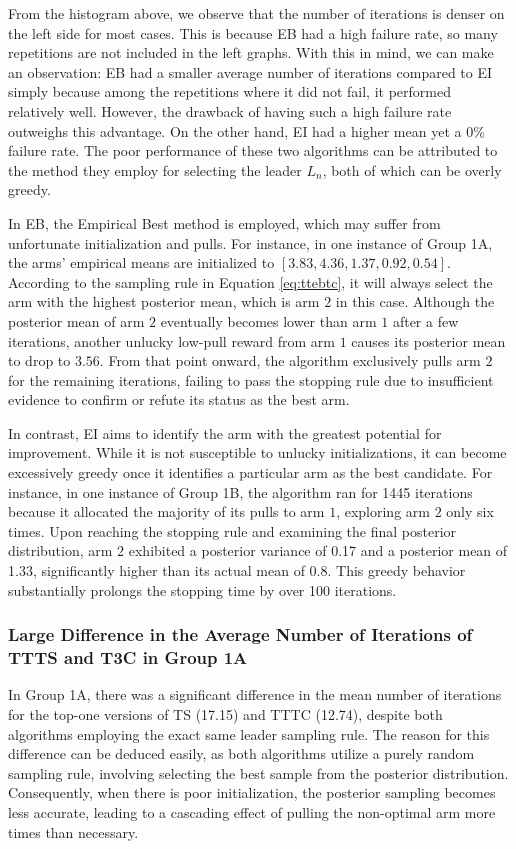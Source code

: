 \documentclass[a4paper, 12pt]{article}
\theoremstyle{definition}
\begin{document}
From the histogram above, we observe that the number of iterations is denser on the left side for most cases. This is because EB had a high failure rate, so many repetitions are not included in the left graphs. With this in mind, we can make an observation: EB had a smaller average number of iterations compared to EI simply because among the repetitions where it did not fail, it performed relatively well. However, the drawback of having such a high failure rate outweighs this advantage. On the other hand, EI had a higher mean yet a 0\% failure rate. The poor performance of these two algorithms can be attributed to the method they employ for selecting the leader $L_n$, both of which can be overly greedy.

In EB, the Empirical Best method is employed, which may suffer from unfortunate initialization and pulls. For instance, in one instance of Group 1A, the arms' empirical means are initialized to $[3.83, 4.36, 1.37, 0.92, 0.54]$. According to the sampling rule in Equation \ref{eq:ttebtc}, it will always select the arm with the highest posterior mean, which is arm $2$ in this case. Although the posterior mean of arm $2$ eventually becomes lower than arm $1$ after a few iterations, another unlucky low-pull reward from arm $1$ causes its posterior mean to drop to $3.56$. From that point onward, the algorithm exclusively pulls arm $2$ for the remaining iterations, failing to pass the stopping rule due to insufficient evidence to confirm or refute its status as the best arm.

In contrast, EI aims to identify the arm with the greatest potential for improvement. While it is not susceptible to unlucky initializations, it can become excessively greedy once it identifies a particular arm as the best candidate. For instance, in one instance of Group 1B, the algorithm ran for 1445 iterations because it allocated the majority of its pulls to arm $1$, exploring arm $2$ only six times. Upon reaching the stopping rule and examining the final posterior distribution, arm $2$ exhibited a posterior variance of 0.17 and a posterior mean of 1.33, significantly higher than its actual mean of 0.8. This greedy behavior substantially prolongs the stopping time by over 100 iterations.

\subsubsection{Large Difference in the Average Number of Iterations of TTTS and T3C in Group 1A}
In Group 1A, there was a significant difference in the mean number of iterations for the top-one versions of TS (17.15) and TTTC (12.74), despite both algorithms employing the exact same leader sampling rule. The reason for this difference can be deduced easily, as both algorithms utilize a purely random sampling rule, involving selecting the best sample from the posterior distribution. Consequently, when there is poor initialization, the posterior sampling becomes less accurate, leading to a cascading effect of pulling the non-optimal arm more times than necessary.
\end{document}
